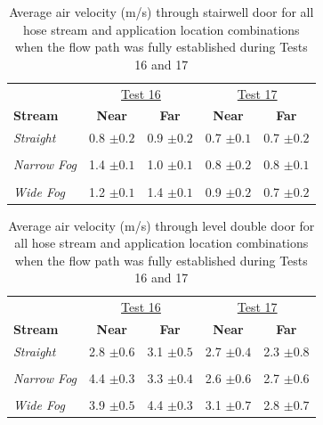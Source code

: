 \documentclass[12pt,oneside]{book}
\begin{document}


\begin{table}[!ht]
\caption{Average air velocity (m/s) through stairwell door for all hose stream and application location combinations when the flow path was fully established during Tests 16 and 17}
\begin{tabular}{lcccc}
\toprule
 & \multicolumn{2}{c}{\underline{Test 16}} & \multicolumn{2}{c}{\underline{Test 17}}
\\
\textbf{Stream} & \textbf{Near} & \textbf{Far} & \textbf{Near} & \textbf{Far} \\
\midrule
\textit{Straight} & 
0.8 $\pm 0.2$ & 0.9 $\pm 0.2$ & 
0.7 $\pm 0.1$ & 0.7 $\pm 0.2$
\\	\multicolumn{5}{c}{}	\\
\textit{Narrow Fog} & 
1.4 $\pm 0.1$ & 1.0 $\pm 0.1$ & 
0.8 $\pm 0.2$ & 0.8 $\pm 0.1 $          
\\	\multicolumn{5}{c}{}	\\
\textit{Wide Fog} 	& 
1.2 $\pm 0.1$ & 1.4 $\pm 0.1$ & 
0.9 $\pm 0.2$ & 0.7 $\pm 0.2$
\\
\bottomrule
\end{tabular}
\label{table:Tests_16_17_BDP_A10_Avgs}
\end{table}

\begin{table}[!ht]
\caption{Average air velocity (m/s) through  level double door for all hose stream and application location combinations when the flow path was fully established during Tests 16 and 17}
\begin{tabular}{lcccc}
\toprule
 & \multicolumn{2}{c}{\underline{Test 16}} & \multicolumn{2}{c}{\underline{Test 17}}
\\
\textbf{Stream} & \textbf{Near} & \textbf{Far} & \textbf{Near} & \textbf{Far} \\
\midrule
\textit{Straight} & 
2.8 $\pm 0.6$ & 3.1 $\pm 0.5$ & 
2.7 $\pm 0.4$ & 2.3 $\pm 0.8$
\\	\multicolumn{5}{c}{}	\\
\textit{Narrow Fog} & 
4.4 $\pm 0.3$ & 3.3 $\pm 0.4$ & 
2.6 $\pm 0.6$ & 2.7 $\pm 0.6$
\\	\multicolumn{5}{c}{}	\\
\textit{Wide Fog} 	& 
3.9 $\pm 0.5$ & 4.4 $\pm 0.3$ & 
3.1 $\pm 0.7$ & 2.8 $\pm 0.7$ 
\\ 
\bottomrule
\end{tabular}
\label{table:Tests_16_17_BDP_A13_Avgs}
\end{table}
\end{document}
